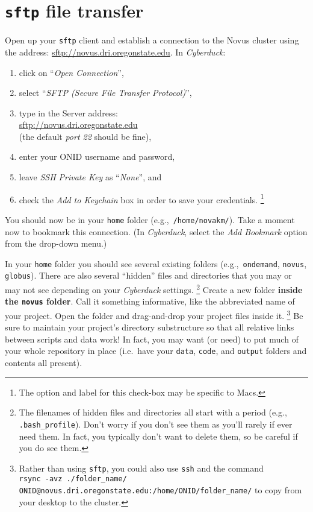 \documentclass[12pt,letterpaper]{article}
\begin{document}
\section{\texttt{sftp} file transfer}

Open up your \texttt{sftp} client and establish a connection to the Novus cluster using the address:
\url{sftp://novus.dri.oregonstate.edu}.
In \emph{Cyberduck}:
\begin{enumerate}
	\item click on ``\emph{Open Connection}'',
	\item select ``\emph{SFTP (Secure File Transfer Protocol)}'',
	\item type in the Server address:\\
	\url{sftp://novus.dri.oregonstate.edu}\\
	(the default \emph{port 22} should be fine),
	\item enter your ONID username and password,
	\item leave \emph{SSH Private Key} as ``\emph{None}'', and
	\item check the \emph{Add to Keychain} box in order to save your credentials.
	\unskip\footnote{The option and label for this check-box may be specific to Macs.}
\end{enumerate}
\noindent
You should now be in your \texttt{home} folder (e.g.,~\texttt{/home/novakm/}).
Take a moment now to bookmark this connection.
(In \emph{Cyberduck}, select the \emph{Add Bookmark} option from the drop-down menu.)

In your \texttt{home} folder you should see several existing folders (e.g.,~\texttt{ondemand}, \texttt{novus}, \texttt{globus}).
There are also several ``hidden'' files and directories that you may or may not see depending on your \textit{Cyberduck} settings.
\unskip
\footnote{The filenames of hidden files and directories all start with a period (e.g., \texttt{.bash\_profile}).
Don't worry if you don't see them as you'll rarely if ever need them.  
In fact, you typically don't want to delete them, so be careful if you do see them.}
Create a new folder \textbf{inside the \texttt{novus} folder}.
Call it something informative, like the abbreviated name of your project.
Open the folder and drag-and-drop your project files inside it.
\unskip
\footnote{Rather than using \texttt{sftp}, 
you could also use \texttt{ssh} and the command \\
\texttt{rsync -avz ./{folder\_name}/ ONID@novus.dri.oregonstate.edu:/home/ONID/{folder\_name}/}
to copy from your desktop to the cluster.}
Be sure to maintain your project's directory substructure so that all relative links between scripts and data work!
In fact, you may want (or need) to put much of your whole repository in place (i.e.~have your \texttt{data}, \texttt{code}, and \texttt{output} folders and contents all present).
\end{document}
